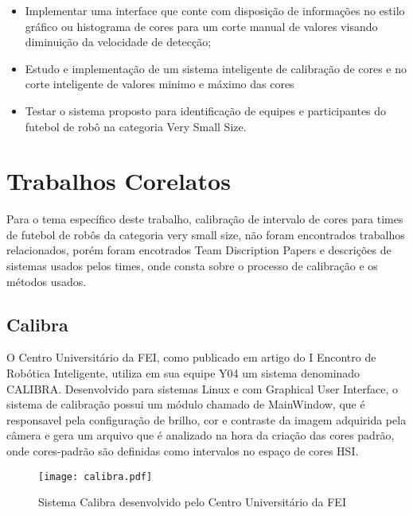 \begin{itemize}
	
	\item Implementar uma interface que conte com disposição de informações no estilo gráfico ou histograma de cores para um corte manual de valores visando diminuição da velocidade de detecção; 
	\item Estudo e implementação de um sistema inteligente de calibração de cores e no corte inteligente de valores minimo e máximo das cores
	\item Testar o sistema proposto para identificação de equipes e participantes do futebol 
	de robô na categoria Very Small Size. 
	
	
\end{itemize}

\newpage

\section{Trabalhos Corelatos}
Para o tema específico deste trabalho, calibração de intervalo de cores para times de futebol de robôs da categoria very small size, não foram encontrados trabalhos relacionados, porém foram encotrados Team Discription Papers e descrições de sistemas usados pelos times, onde consta sobre o processo de calibração e os métodos usados.

\subsection{Calibra}
O Centro Universitário da FEI, como publicado em artigo do I Encontro de Robótica Inteligente\cite{PenharbelTime}, utiliza em sua equipe Y04 um sistema denominado CALIBRA\cite{Penharbel:2004}. Desenvolvido para sistemas Linux e com Graphical User Interface\cite{Penharbel:2004}, o sistema de calibração possui um módulo chamado de MainWindow, que é responsavel pela configuração de brilho, cor e contraste da imagem adquirida pela câmera e gera um arquivo que é analizado na hora da criação das cores padrão\cite{PenharbelTime}, onde cores-padrão são definidas como intervalos no espaço de cores HSI\cite{PenharbelTime}.
\begin{figure}[!h]
	\centering
	\texttt{[image: calibra.pdf]}
	\caption{Sistema Calibra desenvolvido pelo Centro Universitário da FEI \cite{Penharbel:2004}}
	\label{Calibra}
\end{figure}

